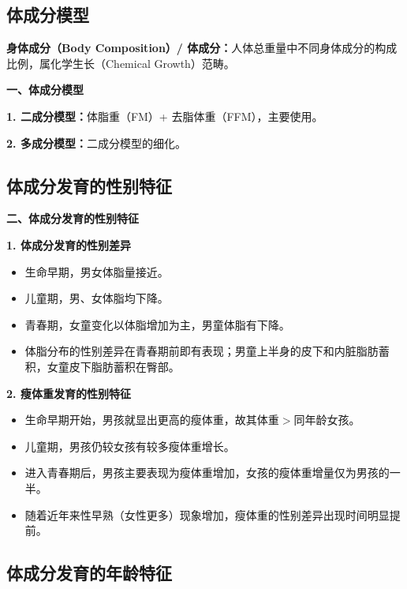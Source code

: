 \subsection{体成分模型}

\begin{defbox}
\textbf{身体成分（Body Composition）/ 体成分：}人体总重量中不同身体成分的构成比例，属化学生长（Chemical Growth）范畴。

\textbf{一、体成分模型}

\textbf{1. 二成分模型：}体脂重（FM）+ 去脂体重（FFM），主要使用。

\textbf{2. 多成分模型：}二成分模型的细化。
\end{defbox}

\subsection{体成分发育的性别特征}

\begin{defbox}
\textbf{二、体成分发育的性别特征}

\textbf{1. 体成分发育的性别差异}
\begin{itemize}[leftmargin=*]
    \item 生命早期，男女体脂量接近。
    \item 儿童期，男、女体脂均下降。
    \item 青春期，女童变化以体脂增加为主，男童体脂有下降。
    \item 体脂分布的性别差异在青春期前即有表现；男童上半身的皮下和内脏脂肪蓄积，女童皮下脂肪蓄积在臀部。
\end{itemize}

\textbf{2. 瘦体重发育的性别特征}
\begin{itemize}[leftmargin=*]
    \item 生命早期开始，男孩就显出更高的瘦体重，故其体重$>$同年龄女孩。
    \item 儿童期，男孩仍较女孩有较多瘦体重增长。
    \item 进入青春期后，男孩主要表现为瘦体重增加，女孩的瘦体重增量仅为男孩的一半。
    \item 随着近年来性早熟（女性更多）现象增加，瘦体重的性别差异出现时间明显提前。
\end{itemize}
\end{defbox}

\subsection{体成分发育的年龄特征}

